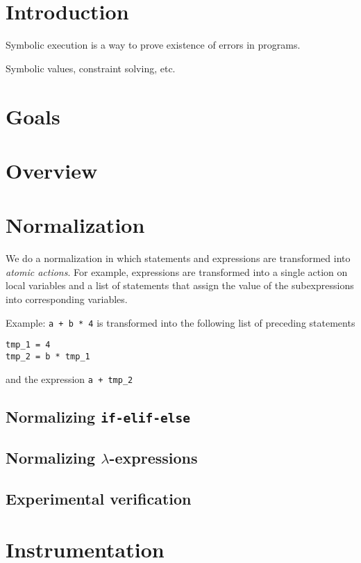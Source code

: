 \documentclass[a4paper]{article}
\begin{document}
\section*{Introduction}

Symbolic execution is a way to prove existence of errors in programs. 

Symbolic values, constraint solving, etc.

\section*{Goals}

\section*{Overview}

\section*{Normalization}

We do a normalization in which statements and expressions are transformed into
\emph{atomic actions}. For example, expressions are transformed into a single
action on local variables and a list of statements that assign the value of the
subexpressions into corresponding variables.

Example: \verb!a + b * 4! is transformed into the following list of
preceding statements
\begin{verbatim}
tmp_1 = 4
tmp_2 = b * tmp_1
\end{verbatim}
and the expression \verb!a + tmp_2!

\subsection*{Normalizing \texttt{if-elif-else}}

\subsection*{Normalizing $\lambda$-expressions}

\subsection*{Experimental verification}

\section*{Instrumentation}
\end{document}

